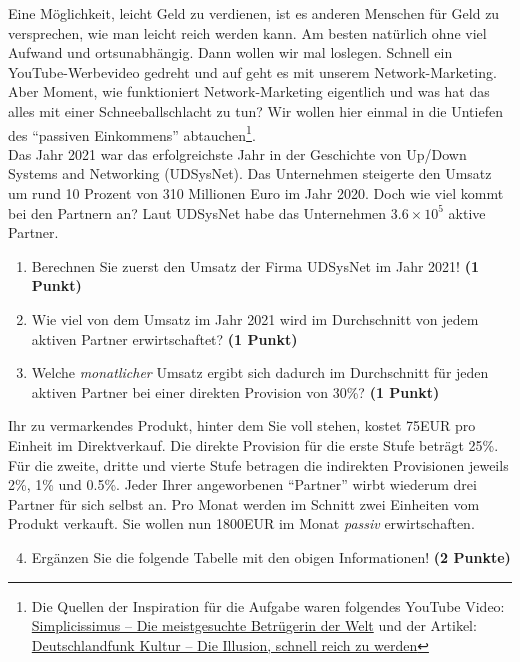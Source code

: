 \documentclass[a4paper, 9pt]{scrartcl}\usepackage[]{graphicx}\usepackage[]{xcolor}
\begin{document}
Eine M{\"o}glichkeit, leicht Geld zu verdienen, ist es anderen Menschen f{\"u}r Geld
zu versprechen, wie man leicht reich werden kann. Am besten nat{\"u}rlich ohne
viel Aufwand und ortsunabh{\"a}ngig. Dann wollen wir mal loslegen. Schnell
ein YouTube-Werbevideo gedreht und auf geht es mit unserem
Network-Marketing. Aber Moment, wie funktioniert Network-Marketing
eigentlich und was hat das alles mit einer Schneeballschlacht zu tun? Wir
wollen hier einmal in die Untiefen des "`passiven Einkommens"'
abtauchen\footnote{Die Quellen der Inspiration f{\"u}r die Aufgabe waren
  folgendes YouTube Video:
  \href{https://youtu.be/UOKkZF_qK9M?si=uf4foJVFKfeQMwSw}{Simplicissimus --
    Die meistgesuchte Betr{\"u}gerin der Welt} und der Artikel:
  \href{https://www.deutschlandfunkkultur.de/netzwerk-marketing-die-illusion-schnell-reich-zu-werden-100.html}{
    Deutschlandfunk Kultur -- Die Illusion, schnell reich zu werden}}.\\

Das Jahr 2021 war das erfolgreichste Jahr in der Geschichte von
Up/Down Systems and Networking (UDSysNet). Das Unternehmen steigerte den Umsatz um rund
10 Prozent von 310 Millionen Euro im Jahr
2020. Doch wie viel kommt bei den Partnern an? Laut
UDSysNet habe das Unternehmen \ensuremath{3.6\times 10^{5}} aktive Partner.

\begin{enumerate}
\item Berechnen Sie zuerst den Umsatz der Firma UDSysNet im
  Jahr 2021! \textbf{(1 Punkt)}
\item Wie viel von dem Umsatz im Jahr 2021 wird im Durchschnitt von jedem
  aktiven Partner erwirtschaftet? \textbf{(1 Punkt)}
\item Welche \textit{monatlicher} Umsatz ergibt sich dadurch im
  Durchschnitt f{\"u}r jeden aktiven Partner bei einer direkten Provision von
  30\%? \textbf{(1 Punkt)}
\end{enumerate}

Ihr zu vermarkendes Produkt, hinter dem Sie voll stehen, kostet
75EUR pro Einheit im Direktverkauf. Die direkte Provision
f{\"u}r die erste Stufe betr{\"a}gt 25\%. F{\"u}r die zweite, dritte und
vierte Stufe betragen die indirekten Provisionen jeweils 2\%,
1\% und 0.5\%. Jeder Ihrer angeworbenen "`Partner"'
wirbt wiederum drei Partner f{\"u}r sich selbst an. Pro Monat
werden im Schnitt zwei Einheiten vom Produkt verkauft. Sie wollen nun
1800EUR im Monat \textit{passiv} erwirtschaften.

\begin{enumerate}
  \setcounter{enumi}{3}
\item Erg{\"a}nzen Sie die folgende Tabelle mit den obigen Informationen! \textbf{(2 Punkte)}
\end{enumerate}
\end{document}
